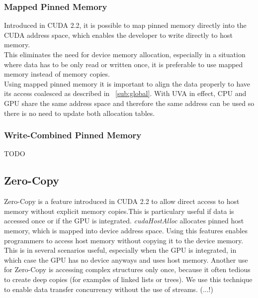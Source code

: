 \subsubsection{Mapped Pinned Memory}
Introduced in CUDA 2.2, it is possible to map pinned memory directly into the CUDA address space, which enables the developer to write directly to host memory.\\
This eliminates the need for device memory allocation, especially in a situation where data has to be only read or written once, it is preferable to use mapped memory instead of memory copies.\\
Using mapped pinned memory it is important to align the data properly to have its access coalesced as described in ~\ref{sub:global}.
With UVA in effect, CPU and GPU share the same address space and therefore the same address can be used so there is no need to update both allocation tables.
\subsubsection{Write-Combined Pinned Memory}
TODO
\subsection{Zero-Copy}
Zero-Copy is a feature introduced in CUDA 2.2 to allow direct access to host memory without explicit memory copies.This is particulary useful if data is accessed once or if the GPU is integrated.
\emph{cudaHostAlloc} allocates pinned host memory, which is mapped into device address space.
Using this features enables programmers to access host memory without copying it to the device memory.
This is in several scenarios useful, especially when the GPU is integrated,
in which case the GPU has no device anyways and uses host memory.
Another use for Zero-Copy is accessing complex structures only once, because it often tedious to create deep copies (for examples of linked lists or trees).
We use this technique to enable data transfer concurrency without the use of streams. (...!)
